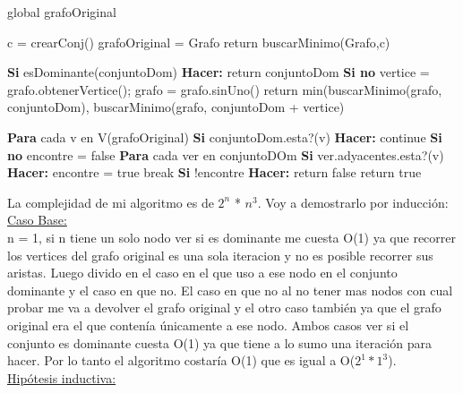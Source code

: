 global grafoOriginal

\begin{codebox}
\li	c = crearConj()
\li	grafoOriginal = Grafo
\li	return buscarMinimo(Grafo,c)
\end{codebox}

\begin{codebox}
\li\textbf{Si} esDominante(conjuntoDom) \textbf{Hacer:} \Do
\li		return conjuntoDom 
\End
\li	\textbf{Si no}  \Do
\li		vertice = grafo.obtenerVertice(); 
\li		grafo = grafo.sinUno()
\li		return min(buscarMinimo(grafo, conjuntoDom), buscarMinimo(grafo, conjuntoDom + vertice)	
\End

\end{codebox}

\begin{codebox}
\li \textbf{Para} cada v en V(grafoOriginal) \Do
\li \textbf{Si} conjuntoDom.esta?(v) \textbf{Hacer:} \Do
\li			continue 
		\End
\li \textbf{Si no}  \Do
\li			encontre = false
\li \textbf{Para} cada ver en conjuntoDOm \Do
\li	\textbf{Si} ver.adyacentes.esta?(v) \textbf{Hacer:} \Do	
\li			encontre = true
\li			break
			\End
	\End		
\li	\textbf{Si} !encontre \textbf{Hacer:} \Do				
\li		return false
			\End		
	\End
\li	return true
\End
\end{codebox}
La complejidad de mi algoritmo es de $2^n$ * $n^3$. Voy a demostrarlo por inducción:\\

\underline{Caso Base:}\\

n = 1, si n tiene un solo nodo ver si es dominante me cuesta O(1) ya que recorrer los vertices del grafo original es una sola iteracion y no es posible recorrer sus aristas. Luego divido en el caso en el que uso a ese nodo en el conjunto dominante y el caso en que no. El caso en que no al no tener mas nodos con cual probar me va a devolver el grafo original y el otro caso también ya que el grafo original era el que contenía únicamente a ese nodo. Ambos casos ver si el conjunto es dominante cuesta O(1) ya que tiene a lo sumo una iteración para hacer. Por lo tanto el algoritmo costaría O(1) que es igual a O($2^1*1^3$).\\

\underline{Hipótesis inductiva:}\\

